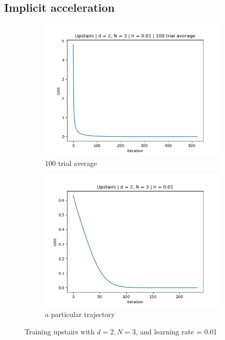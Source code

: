 \documentclass[11pt]{article}
\begin{document}
\subsection{Implicit acceleration} \label{sec:results:acceleration}
\begin{figure}[ht]
    \begin{subfigure}{0.5\textwidth}
        \centering
        \includegraphics[width=\textwidth]{images/upstairs_avg_lr1e-2.png}
        \caption{100 trial average}
        \label{fig:upstairs_avg}
    \end{subfigure}
    \begin{subfigure}{0.5\textwidth}
        \centering
        \includegraphics[width=\textwidth]{images/upstairs_1_lr1e-2.png}
        \caption{a particular trajectory}
        \label{fig:upstairs_1}
    \end{subfigure}
    \caption{Training upstairs with $d = 2, N = 3$, and learning rate = 0.01}
    \label{fig:upstairs}
\end{figure}
\end{document}
